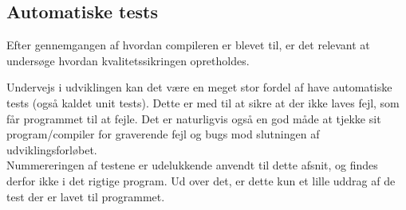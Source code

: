 \subsection{Automatiske tests}
Efter gennemgangen af hvordan compileren er blevet til, er det relevant at undersøge hvordan kvalitetssikringen opretholdes.

\noindent Undervejs i udviklingen kan det være en meget stor fordel af have automatiske tests (også kaldet unit tests). Dette er med til at sikre at der ikke laves fejl, som får programmet til at fejle. Det er naturligvis også en god måde at tjekke sit program/compiler for graverende fejl og bugs mod slutningen af udviklingsforløbet.\\

\noindent Nummereringen af testene er udelukkende anvendt til dette afsnit, og findes derfor ikke i det rigtige program. Ud over det, er dette kun et lille uddrag af de test der er lavet til programmet.
